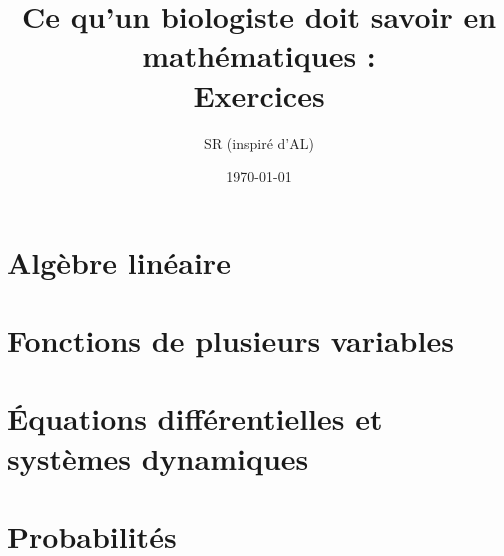 \documentclass[french, 12pt]{article}
\title{{Ce qu'un biologiste doit savoir en mathématiques : \\ Exercices}}
\author{SR (inspiré d'AL)}
\date{\today}
\numberwithin{exercise}{subsection}
\numberwithin{equation}{subsection}
\begin{document}

\maketitle
\tableofcontents

\newpage \section{Algèbre linéaire} 

\newpage \section{Fonctions de plusieurs variables} 

\newpage \section{\'Equations différentielles et systèmes dynamiques} 

\newpage \section{Probabilités} 

% 
% 

\end{document}
